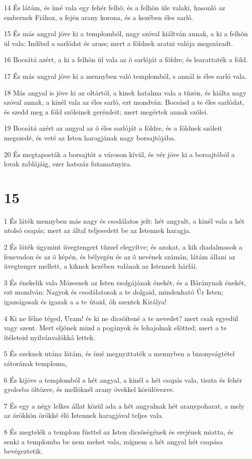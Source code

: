 \par 14 És látám, és ímé vala egy fehér felhõ; és a felhõn üle valaki, hasonló az embernek Fiához, a fején arany korona, és a kezében éles sarló.
\par 15 És más angyal jöve ki a templomból, nagy szóval kiáltván annak, a ki a felhõn ül vala: Indítsd a sarlódat és arass; mert a földnek aratni valója megszáradt.
\par 16 Bocsátá azért, a ki a felhõn ül vala az õ sarlóját a földre; és learattaték a föld.
\par 17 És más angyal jöve ki a mennyben való templomból, s annál is éles sarló vala.
\par 18 Más angyal is jöve ki az oltártól, a kinek hatalma vala a tûzön, és kiálta nagy szóval annak, a kinél vala az éles sarló, ezt mondván: Bocsásd a te éles sarlódat, és szedd meg a föld szõleinek gerézdeit; mert megértek annak szõlei.
\par 19 Bocsátá azért az angyal az õ éles sarlóját a földre, és a földnek szõleit megszedé, és veté az Isten haragjának nagy borsajtójába.
\par 20 És megtaposták a borsajtót a városon kívül, és vér jöve ki a borsajtóból a lovak zablájáig, ezer hatszáz futamatnyira.

\chapter{15}

\par 1 És láték mennyben más nagy és csodálatos jelt: hét angyalt, a kinél vala a hét utolsó csapás; mert az által teljesedett be az Istennek haragja.
\par 2 És láték úgymint üvegtengert tûzzel elegyítve; és azokat, a kik diadalmasok a fenevadon és az õ képén, és bélyegén és az õ nevének  számán, látám állani az üvegtenger mellett, a kiknek kezében valának az Istennek hárfái.
\par 3 És énekelik vala Mózesnek az Isten szolgájának énekét, és a Báránynak énekét, ezt mondván:  Nagyok és csodálatosak a te dolgaid, mindenható Úr Isten; igazságosak és igazak a  a te útaid, óh szentek Királya!
\par 4 Ki ne félne téged, Uram! és ki ne dicsõítené a te nevedet? mert csak egyedül vagy szent. Mert  eljõnek mind a pogányok és lehajolnak elõtted; mert a te ítéleteid nyilvánvalókká lettek.
\par 5 És ezeknek utána látám, és ímé megnyittaték a mennyben a bizonyságtétel sátorának temploma,
\par 6 És kijöve a templomból a hét angyal, a kinél a hét csapás vala, tiszta és fehér gyolcsba öltözve, és mellöknél arany övekkel körülövezve.
\par 7 És egy a négy lelkes állat közül ada a hét angyalnak hét aranypoharat, a mely az örökkön örökké élõ Istennek haragjával teljes vala.
\par 8 És megtelék a templom füsttel az Isten dicsõségének és erejének miatta, és senki a templomba be nem mehet vala, mígnem a hét angyal  hét csapása bevégeztetik.

